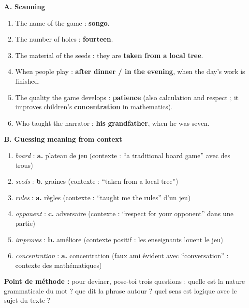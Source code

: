 \documentclass[11pt]{article}
\begin{document}
\begin{corrige}
\textbf{A. Scanning}
\begin{enumerate}
\item The name of the game : \textbf{songo}.
\item The number of holes : \textbf{fourteen}.
\item The material of the seeds : they are \textbf{taken from a local tree}.
\item When people play : \textbf{after dinner / in the evening}, when the day's work is finished.
\item The quality the game develops : \textbf{patience} (also calculation and respect ; it improves children's \textbf{concentration} in mathematics).
\item Who taught the narrator : \textbf{his grandfather}, when he was seven.
\end{enumerate}
\textbf{B. Guessing meaning from context}
\begin{enumerate}
\item \emph{board} : \textbf{a.} plateau de jeu (contexte : “a traditional board game” avec des trous)
\item \emph{seeds} : \textbf{b.} graines (contexte : “taken from a local tree”)
\item \emph{rules} : \textbf{a.} règles (contexte : “taught me the rules” d'un jeu)
\item \emph{opponent} : \textbf{c.} adversaire (contexte : “respect for your opponent” dans une partie)
\item \emph{improves} : \textbf{b.} améliore (contexte positif : les enseignants louent le jeu)
\item \emph{concentration} : \textbf{a.} concentration (faux ami évident avec “conversation” : contexte des mathématiques)
\end{enumerate}
\textbf{Point de méthode :} pour deviner, pose-toi trois questions : quelle est la nature grammaticale du mot ? que dit la phrase autour ? quel sens est logique avec le sujet du texte ?
\end{corrige}
\end{document}
